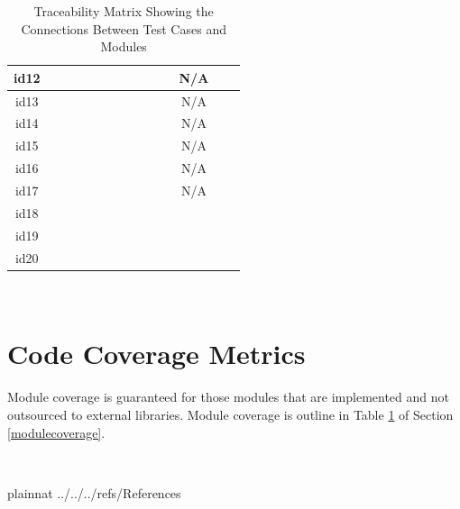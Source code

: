 \documentclass[12pt, titlepage]{article}
\begin{document}
\begin{table}[!h]
\begin{center}
\begin{tabular}{| c | c | c | c | c | c | c | c | c | c | c | c | c | c |}
			\hline
			id12 &\checkmark &\checkmark &\checkmark & \checkmark & \checkmark& \checkmark&\checkmark & \checkmark& \checkmark&\checkmark & N/A &\checkmark &\checkmark\\
			\hline
			id13 &\checkmark &\checkmark &\checkmark & \checkmark & \checkmark& \checkmark&\checkmark & \checkmark& \checkmark&\checkmark & N/A &\checkmark &\checkmark\\
			\hline
			id14 &\checkmark &\checkmark &\checkmark & \checkmark & \checkmark& \checkmark&\checkmark & \checkmark& \checkmark&\checkmark & N/A &\checkmark &\checkmark\\
			\hline
			id15 &\checkmark &\checkmark &\checkmark & \checkmark & \checkmark& \checkmark&\checkmark & \checkmark& \checkmark&\checkmark & N/A &\checkmark &\checkmark\\
			\hline
			id16 &\checkmark &\checkmark &\checkmark & \checkmark & \checkmark& \checkmark&\checkmark & \checkmark& \checkmark&\checkmark & N/A &\checkmark &\checkmark\\
			\hline
			id17 &\checkmark &\checkmark &\checkmark & \checkmark & \checkmark& \checkmark&\checkmark & \checkmark& \checkmark&\checkmark & N/A &\checkmark &\checkmark\\
			\hline
			id18 &\checkmark &\checkmark &\checkmark & \checkmark & \checkmark& \checkmark&\checkmark & \checkmark& \checkmark&\checkmark & \checkmark &\checkmark &\checkmark\\
			\hline
			id19 &\checkmark &\checkmark &\checkmark & \checkmark & \checkmark& \checkmark&\checkmark & \checkmark& \checkmark&\checkmark & \checkmark &\checkmark &\checkmark\\
			\hline
			id20 &\checkmark &\checkmark &\checkmark & \checkmark & \checkmark& \checkmark&\checkmark & \checkmark& \checkmark&\checkmark & \checkmark &\checkmark &\checkmark\\
			\hline
		\end{tabular}
		\caption{Traceability Matrix Showing the Connections Between Test Cases and Modules}
		\label{Table:MODCOV}
	\end{center}
\end{table}  	

~\newpage

\section{Code Coverage Metrics}

Module coverage is guaranteed for those modules that are implemented and not outsourced to external libraries. Module coverage is outline in Table \ref{Table:MODCOV} of Section \ref{modulecoverage}.

~\newpage

 {plainnat}
 {../../../refs/References}
\end{document}
